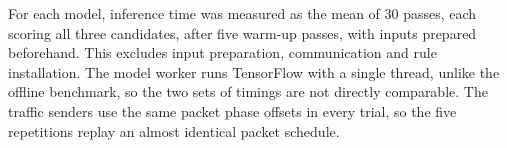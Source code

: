 For each model, inference time was measured as the mean of 30 passes, each scoring all three candidates, after five warm-up passes, with inputs prepared beforehand. This excludes input preparation, communication and rule installation. The model worker runs TensorFlow with a single thread, unlike the offline benchmark, so the two sets of timings are not directly comparable. The traffic senders use the same packet phase offsets in every trial, so the five repetitions replay an almost identical packet schedule.
